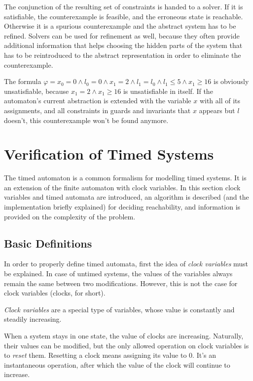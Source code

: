 The conjunction of the resulting set of constraints is handed to a solver. If it is satisfiable, the counterexample is feasible, and the erroneous state is reachable. Otherwise it is a spurious counterexample and the abstract system has to be refined. Solvers can be used for refinement as well, because they often provide additional information that helps choosing the hidden parts of the system that has to be reintroduced to the abstract representation in order to eliminate the counterexample.

\begin{example}
	The formula $\varphi = x_0=0 \wedge l_0=0 \wedge x_1=2 \wedge l_1=l_0 \wedge l_1 \leq 5 \wedge x_1 \geq 16$ is obviously unsatisfiable, because $x_1=2 \wedge x_1 \geq 16$ is unsatisfiable in itself. If the automaton's current abstraction is extended with the variable $x$ with all of its assignments, and all constraints in guards and invariants that $x$ appears but $l$ doesn't, this counterexample won't be found anymore.
\end{example}


\section{Verification of Timed Systems}

The timed automaton is a common formalism for modelling timed systems. It is an extension of the finite automaton with clock variables. In this section clock variables and timed automata are introduced, an algorithm is described (and the implementation briefly explained) for deciding reachability, and information is provided on the complexity of the problem.

\subsection{Basic Definitions}


In order to properly define timed automata, first the idea of \emph{clock variables} must be explained. In case of untimed systems, the values of the variables always remain the same between two modifications. However, this is not the case for clock variables (clocks, for short).

\begin{dfn}
	\emph{Clock variables} are a special type of variables, whose value is constantly and steadily increasing.
\end{dfn}

When a system stays in one state, the value of clocks are increasing. Naturally, their values can be modified, but the only allowed operation on clock variables is to \emph{reset} them. Resetting a clock means assigning its value to 0. It's an instantaneous operation, after which the value of the clock will continue to increase.

